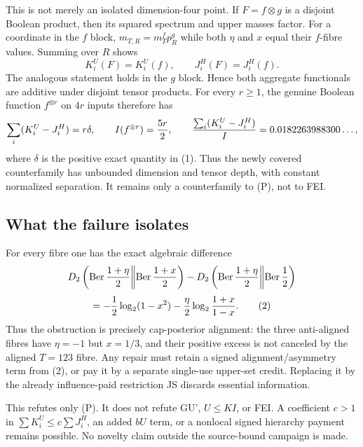 This is not merely an isolated dimension-four point.  If $F=f\otimes g$ is a
disjoint Boolean product, then its squared spectrum and upper masses factor.
For a coordinate in the $f$ block, $m_{T,R}=m_T^f p_R^g$ while both $\eta$
and $x$ equal their $f$-fibre values.  Summing over $R$ shows
\[
 K_i^U(F)=K_i^U(f),\qquad J_i^H(F)=J_i^H(f).
\]
The analogous statement holds in the $g$ block.  Hence both aggregate
functionals are additive under disjoint tensor products.  For every $r\ge1$,
the genuine Boolean function $f^{\otimes r}$ on $4r$ inputs therefore has
\[
 \sum_i(K_i^U-J_i^H)=r\delta,
 \qquad I(f^{\otimes r})={5r\over2},
 \qquad {\sum_i(K_i^U-J_i^H)\over I}=0.0182263988300\ldots,
\]
where $\delta$ is the positive exact quantity in (1).  Thus the newly covered
counterfamily has unbounded dimension and tensor depth, with constant
normalized separation.  It remains only a counterfamily to (P), not to FEI.

\subsection*{What the failure isolates}

For every fibre one has the exact algebraic difference
\[
 D_2\left(\operatorname{Ber}{1+\eta\over2}\middle\|
               \operatorname{Ber}{1+x\over2}\right)
 -D_2\left(\operatorname{Ber}{1+\eta\over2}\middle\|
               \operatorname{Ber}{1\over2}\right)
\]
\[
 =-{1\over2}\log_2(1-x^2)
   -{\eta\over2}\log_2{1+x\over1-x}.\tag{2}
\]
Thus the obstruction is precisely cap-posterior alignment: the three
anti-aligned fibres have $\eta=-1$ but $x=1/3$, and their positive excess is
not canceled by the aligned $T=123$ fibre.  Any repair must retain a signed
alignment/asymmetry term from (2), or pay it by a separate single-use upper-set
credit.  Replacing it by the already influence-paid restriction JS discards
essential information.

This refutes only (P).  It does not refute GU', $U\leq KI$, or FEI.  A
coefficient $c>1$ in $\sum K_i^U\leq c\sum J_i^H$, an added $bU$ term, or a
nonlocal signed hierarchy payment remains possible.  No novelty claim outside
the source-bound campaign is made.
